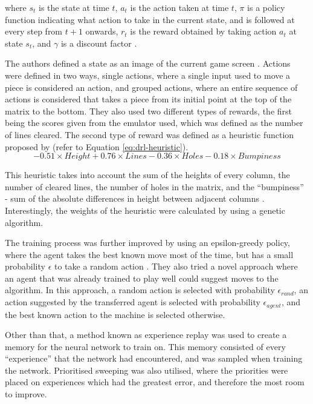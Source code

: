 \documentclass[a4paper, 12pt]{extreport}
\begin{document}
	\noindent where $s_t$ is the state at time $t$, $a_t$ is the action taken at time $t$, $\pi$ is a policy function indicating what action to take in the current state, and is followed at every step from $t+1$ onwards, $r_t$ is the reward obtained by taking action $a_t$ at state $s_t$, and $\gamma$ is a discount factor \cite{tetris-drl}.
	
	The authors defined a state as an image of the current game screen \cite{tetris-drl}. Actions were defined in two ways, single actions, where a single input used to move a piece is considered an action, and grouped actions, where an entire sequence of actions is considered that takes a piece from its initial point at the top of the matrix to the bottom. They also used two different types of rewards, the first being the scores given from the emulator used, which was defined as the number of lines cleared. The second type of reward was defined as a heuristic function proposed by \citeauthor{lee-ai} \cite{lee-ai} (refer to Equation \ref{eq:drl-heuristic}).
	\begin{equation}\label{eq:drl-heuristic}
		-0.51 \times Height + 0.76 \times Lines - 0.36 \times Holes - 0.18 \times Bumpiness
	\end{equation}
	
	This heuristic takes into account the sum of the heights of every column, the number of cleared lines, the number of holes in the matrix, and the ``bumpiness'' - sum of the absolute differences in height between adjacent columns \cite{lee-ai}. Interestingly, the weights of the heuristic were calculated by using a genetic algorithm. 
	
	The training process was further improved by using an epsilon-greedy policy, where the agent takes the best known move most of the time, but has a small probability $\epsilon$ to take a random action \cite{tetris-drl}. They also tried a novel approach where an agent that was already trained to play well could suggest moves to the algorithm. In this approach, a random action is selected with probability $\epsilon_{rand}$, an action suggested by the transferred agent is selected with probability $\epsilon_{agent}$, and the best known action to the machine is selected otherwise.
	
	Other than that, a method known as experience replay was used to create a memory for the neural network to train on. This memory consisted of every ``experience'' that the network had encountered, and was sampled when training the network. Prioritised sweeping was also utilised, where the priorities were placed on experiences which had the greatest error, and therefore the most room to improve.
	
\end{document}
